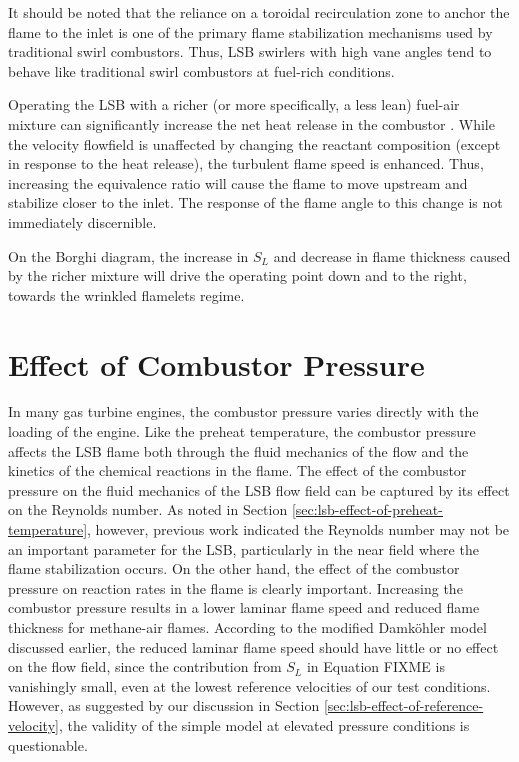 It should be noted that the reliance on a toroidal recirculation zone to anchor the flame to the inlet is one of the primary flame stabilization mechanisms used by traditional swirl combustors.
Thus, LSB swirlers with high vane angles tend to behave like traditional swirl combustors at fuel-rich conditions.

Operating the LSB with a richer (or more specifically, a less lean) fuel-air mixture can significantly increase the net heat release in the combustor .
While the velocity flowfield is unaffected by changing the reactant composition (except in response to the heat release), the turbulent flame speed is enhanced.
Thus, increasing the equivalence ratio will cause the flame to move upstream and stabilize closer to the inlet.
The response of the flame angle to this change is not immediately discernible.

On the Borghi diagram, the increase in \(S_L\) and decrease in flame thickness caused by the richer mixture will drive the operating point down and to the right, towards the wrinkled flamelets regime.

\section{Effect of Combustor Pressure}
\label{sec:lsb-effect-of-combustor-pressure}

In many gas turbine engines, the combustor pressure varies directly with the loading of the engine.
Like the preheat temperature, the combustor pressure affects the LSB flame both through the fluid mechanics of the flow and the kinetics of the chemical reactions in the flame.
The effect of the combustor pressure on the fluid mechanics of the LSB flow field can be captured by its effect on the Reynolds number.
As noted in Section \ref{sec:lsb-effect-of-preheat-temperature}, however, previous work indicated the Reynolds number may not be an important parameter for the LSB, particularly in the near field where the flame stabilization occurs. 
On the other hand, the effect of the combustor pressure on reaction rates in the flame is clearly important.
Increasing the combustor pressure results in a lower laminar flame speed and reduced flame thickness for methane-air flames.
According to the modified Damk\"ohler model discussed earlier, the reduced laminar flame speed should have little or no effect on the flow field, since the contribution from \(S_L\) in Equation FIXME is vanishingly small, even at the lowest reference velocities of our test conditions.
However, as suggested by our discussion in Section \ref{sec:lsb-effect-of-reference-velocity}, the validity of the simple model at elevated pressure conditions is questionable.

